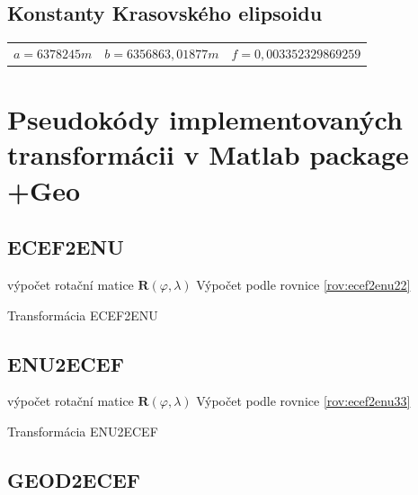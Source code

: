 \documentclass[11pt,a4paper]{article}
\begin{document}
\begin{appendices}
\subsection{Konstanty Krasovského elipsoidu}
\begin{table}[ht!]
\begin{tabular}{c c c}
$a = 6 378 245 m$ & $b = 6 356 863,01877 m$ & $f = 0,00335 23298 69259$ \\
\end{tabular}
\end{table}


\section{Pseudokódy implementovaných transformácii v Matlab package +Geo}

\subsection{ECEF2ENU} \label{appEcef2Enu}

\begin{algorithm}[H]
 výpočet rotační matice $\mathbf{R}\left(\varphi, \lambda\right)$\;	
 Výpočet podle rovnice \ref{rov:ecef2enu22}
 \caption{Transformácia ECEF2ENU}
\end{algorithm} 

\subsection{ENU2ECEF} \label{appEnu2Ecef}

\begin{algorithm}[H]
 výpočet rotační matice $\mathbf{R}\left(\varphi, \lambda\right)$\;	
 Výpočet podle rovnice \ref{rov:ecef2enu33}
 \caption{Transformácia ENU2ECEF}
\end{algorithm} 

\subsection{GEOD2ECEF} \label{appGeod2Ecef}


\end{appendices}
\end{document}
